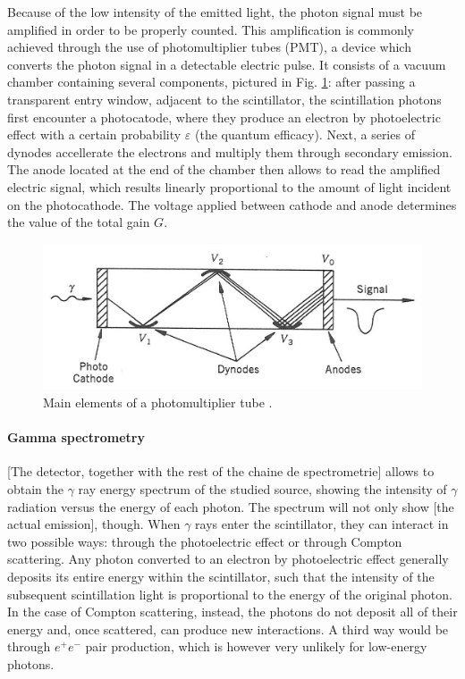 Because of the low intensity of the emitted light, the photon signal must be amplified in order to be properly counted.
This amplification is commonly achieved through the use of photomultiplier tubes (PMT), a device which converts the photon signal in a detectable electric pulse.
It consists of a vacuum chamber containing several components, pictured in Fig. \ref{fig:photomultiplier}: 
after passing a transparent entry window, adjacent to the scintillator, the scintillation photons first encounter a photocatode, 
where they produce an electron by photoelectric effect with a certain probability $\varepsilon$ (the quantum efficacy).
Next, a series of dynodes accellerate the electrons and multiply them through secondary emission.
The anode located at the end of the chamber then allows to read the amplified electric signal, 
which results linearly proportional to the amount of light incident on the photocathode.
The voltage applied between cathode and anode determines the value of the total gain $G$.
\begin{figure}[htbp]
    \centering
    \includegraphics[scale=1.2]{figures/photomultiplier.jpg}
    \caption{Main elements of a photomultiplier tube \cite{intro_nuclear_particle_physics}.}
    \label{fig:photomultiplier}
\end{figure}

\paragraph{Gamma spectrometry}
[The detector, together with the rest of the chaine de spectrometrie] allows to obtain the $\gamma$ ray energy spectrum of the studied source, showing the intensity of $\gamma$ radiation versus the energy of each photon.
The spectrum will not only show [the actual emission], though.
When $\gamma$ rays enter the scintillator, they can interact in two possible ways: through the photoelectric effect or through Compton scattering.
Any photon converted to an electron by photoelectric effect generally deposits its entire energy within the scintillator, such that the intensity of the subsequent scintillation light is proportional to the energy of the original photon.
In the case of Compton scattering, instead, the photons do not deposit all of their energy and, once scattered, can produce new interactions.
A third way would be through $e^+ e^-$ pair production, which is however very unlikely for low-energy photons.



